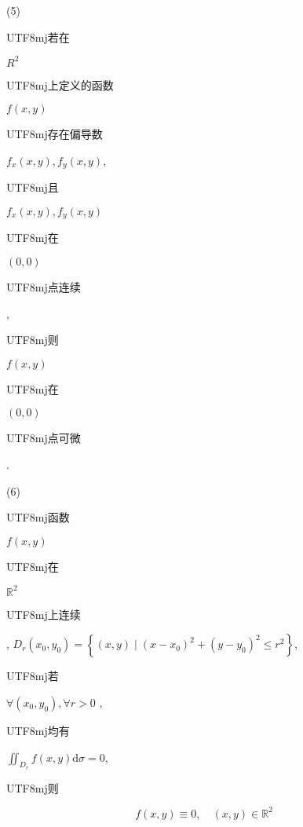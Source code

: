 \documentclass[10pt]{article}
\begin{document}
(5) \begin{CJK}{UTF8}{mj}若在\end{CJK} $R^{2}$ \begin{CJK}{UTF8}{mj}上定义的函数\end{CJK} $f(x, y)$ \begin{CJK}{UTF8}{mj}存在偏导数\end{CJK} $f_{x}(x, y), f_{y}(x, y)$, \begin{CJK}{UTF8}{mj}且\end{CJK} $f_{x}(x, y), f_{y}(x, y)$ \begin{CJK}{UTF8}{mj}在\end{CJK} $(0,0)$ \begin{CJK}{UTF8}{mj}点连续\end{CJK}, \begin{CJK}{UTF8}{mj}则\end{CJK} $f(x, y)$ \begin{CJK}{UTF8}{mj}在\end{CJK} $(0,0)$ \begin{CJK}{UTF8}{mj}点可微\end{CJK}.

(6) \begin{CJK}{UTF8}{mj}函数\end{CJK} $f(x, y)$ \begin{CJK}{UTF8}{mj}在\end{CJK} $\mathbb{R}^{2}$ \begin{CJK}{UTF8}{mj}上连续\end{CJK}, $D_{r}\left(x_{0}, y_{0}\right)=\left\{(x, y) \mid\left(x-x_{0}\right)^{2}+\left(y-y_{0}\right)^{2} \leqslant r^{2}\right\}$, \begin{CJK}{UTF8}{mj}若\end{CJK} $\forall\left(x_{0}, y_{0}\right), \forall r>0$ , \begin{CJK}{UTF8}{mj}均有\end{CJK} $\iint_{D_{r}} f(x, y) \mathrm{d} \sigma=0$, \begin{CJK}{UTF8}{mj}则\end{CJK}
$$
f(x, y) \equiv 0, \quad(x, y) \in \mathbb{R}^{2}
$$
\end{document}
